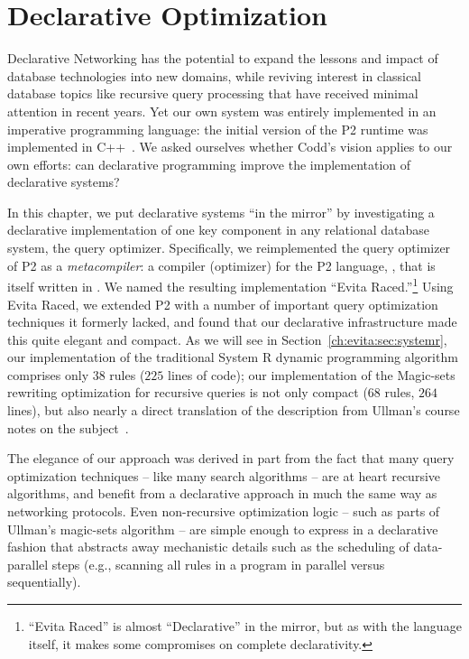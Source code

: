 \chapter[Declarative Optimization]{Declarative Optimization}
\label{ch:evita}

Declarative Networking has the potential to expand the lessons and impact of
database technologies into new domains, while reviving interest in classical
database topics like recursive query processing that have received minimal
attention in recent years.  Yet our own system was entirely implemented in an
imperative programming language: the initial version of the P2 runtime was
implemented in C++~\cite{p2:sosp}.  We asked ourselves whether Codd's vision
applies to our own efforts: can declarative programming improve the
implementation of declarative systems?

In this chapter, we put declarative systems ``in the mirror'' by investigating
a declarative implementation of one key component in any relational database
system, the query optimizer.  Specifically, we reimplemented the query
optimizer of P2 as a {\em metacompiler}: a compiler (optimizer) for the P2
language, \OVERLOG, that is itself written in \OVERLOG.  We named the resulting
implementation ``Evita Raced.''\footnote{``Evita Raced'' is almost
``Declarative'' in the mirror, but as with the \OVERLOG language itself, it
makes some compromises on complete declarativity.} Using Evita Raced, we
extended P2 with a number of important query optimization techniques it
formerly lacked, and found that our declarative infrastructure made this quite
elegant and compact.  As we will see in Section~\ref{ch:evita:sec:systemr}, our
implementation of the traditional System R dynamic programming algorithm
comprises only $38$ \OVERLOG rules ($225$ lines of code); our implementation of the
Magic-sets rewriting optimization for recursive queries is not only compact ($68$
rules, $264$ lines), but also nearly a direct translation of the description from
Ullman's course notes on the subject~\cite{ullmanNotes}.

The elegance of our approach was derived in part from the fact that many query
optimization techniques -- like many search algorithms -- are at heart
recursive algorithms, and benefit from a declarative approach in much the same
way as networking protocols.  Even non-recursive optimization logic -- such as
parts of Ullman's magic-sets algorithm -- are simple enough to express in a
declarative fashion that abstracts away mechanistic details such as the
scheduling of data-parallel steps (e.g., scanning all rules in a program in
parallel versus sequentially).

